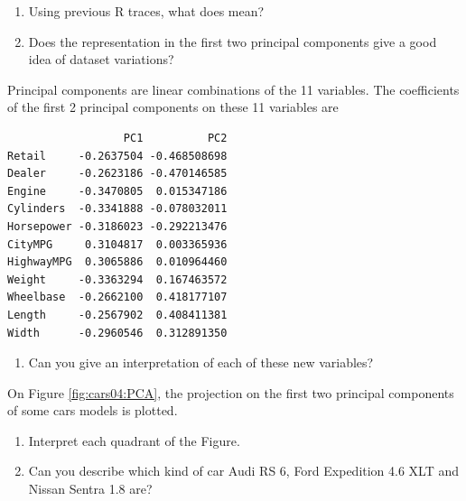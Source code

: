 \documentclass[
  11pt,
  a4paper,
]{article}
\newenvironment{Shaded}{\begin{snugshade}}{\end{snugshade}}
\newcommand{\DecValTok}[1]{\textcolor[rgb]{0.00,0.00,0.81}{#1}}
\newcommand{\NormalTok}[1]{#1}
\newcommand{\SpecialCharTok}[1]{\textcolor[rgb]{0.00,0.00,0.00}{#1}}
\newcommand{\soft}{\textsf}
\begin{document}
\begin{enumerate}
\item Using previous \soft{R} traces, what does  mean? 
\item Does the representation in the first two principal components give a good idea of dataset variations? 
\end{enumerate}

Principal components are linear combinations of the 11 variables. The
coefficients of the first 2 principal components on these 11 variables
are

\begin{Shaded}
\end{Shaded}

\begin{verbatim}
                  PC1          PC2
Retail     -0.2637504 -0.468508698
Dealer     -0.2623186 -0.470146585
Engine     -0.3470805  0.015347186
Cylinders  -0.3341888 -0.078032011
Horsepower -0.3186023 -0.292213476
CityMPG     0.3104817  0.003365936
HighwayMPG  0.3065886  0.010964460
Weight     -0.3363294  0.167463572
Wheelbase  -0.2662100  0.418177107
Length     -0.2567902  0.408411381
Width      -0.2960546  0.312891350
\end{verbatim}

\begin{enumerate}[resume]
\item 
Can you give an interpretation of each of these new variables?
\end{enumerate}

On Figure \ref{fig:cars04:PCA}, the projection on the first two
principal components of some cars models is plotted.

\begin{enumerate}[resume]
\item Interpret each quadrant of the Figure.
\item Can you describe which kind of car Audi RS 6, Ford Expedition 4.6 XLT and Nissan Sentra 1.8 are?
\end{enumerate}
\end{document}
